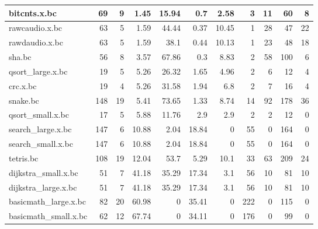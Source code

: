 \begin{tabular}{l|r|r|r|r|r|r|r|r|r|r|}
\hline
 bitcnts.x.bc         &       69 &    9 &   1.45 &    15.94 &   0.7  &     2.58 &     3 &      11 &         60 &         8 \\
\hline
 rawcaudio.x.bc       &       63 &    5 &   1.59 &    44.44 &   0.37 &    10.45 &     1 &      28 &         47 &        22 \\
\hline
 rawdaudio.x.bc       &       63 &    5 &   1.59 &    38.1  &   0.44 &    10.13 &     1 &      23 &         48 &        18 \\
\hline
 sha.bc               &       56 &    8 &   3.57 &    67.86 &   0.3  &     8.83 &     2 &      58 &        100 &         6 \\
\hline
 qsort\_large.x.bc     &       19 &    5 &   5.26 &    26.32 &   1.65 &     4.96 &     2 &       6 &         12 &         4 \\
\hline
 crc.x.bc             &       19 &    4 &   5.26 &    31.58 &   1.94 &     6.8  &     2 &       7 &         16 &         4 \\
\hline
 snake.bc             &      148 &   19 &   5.41 &    73.65 &   1.33 &     8.74 &    14 &      92 &        178 &        36 \\
\hline
 qsort\_small.x.bc     &       17 &    5 &   5.88 &    11.76 &   2.9  &     2.9  &     2 &       2 &         12 &         0 \\
\hline
 search\_large.x.bc    &      147 &    6 &  10.88 &     2.04 &  18.84 &     0    &    55 &       0 &        164 &         0 \\
\hline
 search\_small.x.bc    &      147 &    6 &  10.88 &     2.04 &  18.84 &     0    &    55 &       0 &        164 &         0 \\
\hline
 tetris.bc            &      108 &   19 &  12.04 &    53.7  &   5.29 &    10.1  &    33 &      63 &        209 &        24 \\
\hline
 dijkstra\_small.x.bc  &       51 &    7 &  41.18 &    35.29 &  17.34 &     3.1  &    56 &      10 &         81 &        10 \\
\hline
 dijkstra\_large.x.bc  &       51 &    7 &  41.18 &    35.29 &  17.34 &     3.1  &    56 &      10 &         81 &        10 \\
\hline
 basicmath\_large.x.bc &       82 &   20 &  60.98 &     0    &  35.41 &     0    &   222 &       0 &        115 &         0 \\
\hline
 basicmath\_small.x.bc &       62 &   12 &  67.74 &     0    &  34.11 &     0    &   176 &       0 &         99 &         0 \\
\hline
\end{tabular}
